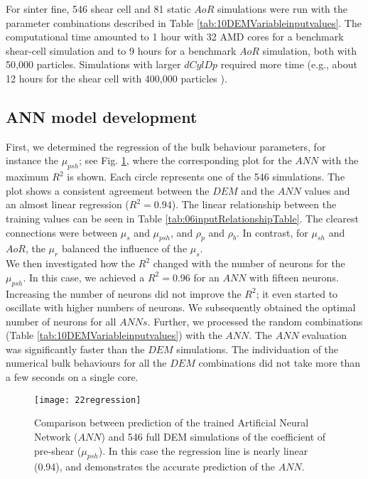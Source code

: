 \documentclass[review]{elsarticle}
\begin{document}
For sinter fine, 546 shear cell and 81 static $AoR$ simulations were run with
the parameter combinations described in Table
\ref{tab:10DEMVariableinputvalues}.
The computational time amounted to 1 hour with 32 AMD cores for a benchmark
shear-cell simulation and to 9 hours for a benchmark $AoR$ simulation, both with
50,000 particles.
Simulations with larger $dCylDp$ required more time (e.g., about 12 hours for
the shear cell with 400,000 particles ). \\


\subsection{ANN model development}
\label{subsec:annmodeldev}

First, we determined the regression of the bulk behaviour parameters, for
instance the $\mu_{psh}$; see Fig. \ref{fig:22regression}, where the
corresponding plot for the $ANN$ with the maximum $R^2$ is shown. Each circle represents one of the 546
simulations.
The plot shows a consistent agreement between the 
$DEM$ and the $ANN$ values and an almost linear regression ($R^2
= 0.94$).
The linear relationship between the
training values can be seen in Table \ref{tab:06inputRelationshipTable}.
The clearest connections were between $\mu_s$ and $\mu_{psh}$, and
$\rho_p$ and $\rho_b$.
In contrast, for $\mu_{sh}$ and $AoR$, the $\mu_r$ balanced the influence of the 
$\mu_s$. \\
We then investigated how the $R^2$ changed with the number of neurons
for the $\mu_{psh}$.
In this case, we achieved a $R^2 = 0.96$ for an $ANN$ with fifteen neurons. 
Increasing the number of neurons did not improve the $R^2$; it even started to
oscillate with higher numbers of neurons.
We subsequently obtained the optimal number of neurons for all $ANNs$.
Further, we processed the random combinations (Table
\ref{tab:10DEMVariableinputvalues}) with the $ANN$.
The $ANN$ evaluation was significantly faster than the $DEM$ simulations. The
individuation of the numerical bulk behaviours for all the $DEM$ combinations
did not take more than a few seconds on a single core.
\begin{figure}[!h] 
\centering 
\texttt{[image: 22regression]}
\caption[Comparison between prediction of the trained NN and full DEM
simulation]{Comparison between prediction of the trained Artificial Neural
Network ($ANN$) and 546 full DEM simulations of the coefficient of pre-shear
($\mu_{psh}$). In this case the regression line is nearly linear (0.94), and
demonstrates the accurate prediction of the $ANN$.}
\label{fig:22regression} 
\end{figure}
\end{document}
